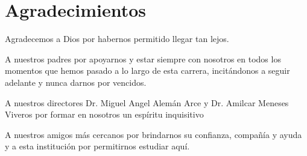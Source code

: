 
\chapter*{Agradecimientos}

Agradecemos a Dios por habernos permitido llegar tan lejos.

\vspace{0.5 cm}

A nuestros padres por apoyarnos y estar siempre con nosotros en todos los momentos que hemos pasado a lo largo de esta carrera, incitándonos a seguir adelante y nunca darnos por vencidos.

\vspace{0.5 cm}

A nuestros directores Dr. Miguel Angel Alemán Arce y Dr. Amilcar Meneses Viveros por formar en nosotros un espíritu inquisitivo

\vspace{0.5 cm}

A nuestros amigos más cercanos por brindarnos su confianza, compañía y ayuda y a esta institución por permitirnos estudiar aquí.


